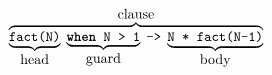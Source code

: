 \documentclass[11pt]{article}
\newcommand\erlcode[1]{\texttt{#1}}
\begin{document}
\thispagestyle{empty}
\begin{equation*}
\overbrace{\underbrace{\erlcode{fact(N)}}_{\textrm{\normalsize head}} \; \underbrace{\erlcode{\textbf{when} N > 1}}_{\textrm{\normalsize guard}} \; \erlcode{->} \; \underbrace{\erlcode{N * fact(N-1)}}_{\textrm{\normalsize body}}}^{\textrm{\normalsize clause}}
\end{equation*}
\end{document}
